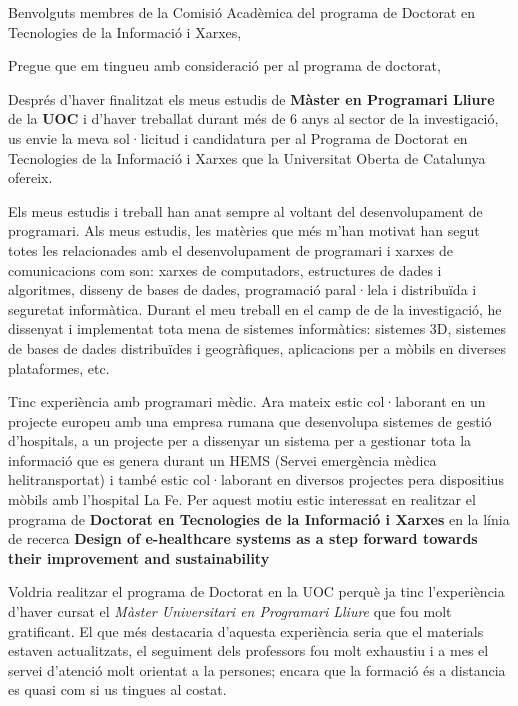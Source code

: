 
%
%


\date{\today}
\opening{Benvolguts membres de la Comisió Acadèmica del programa de Doctorat en Tecnologies de la Informació i Xarxes,}
\closing{Pregue que em tingueu amb consideració per al programa de doctorat,}




\makelettertitle

Després d'haver finalitzat els meus estudis de \textbf{Màster en Programari Lliure} de la \textbf{UOC} i d'haver treballat durant més de 6 anys al sector de la investigació, us envie la meva sol·licitud i candidatura per al Programa de Doctorat en Tecnologies de la Informació i Xarxes que la Universitat Oberta de Catalunya ofereix.

Els meus estudis i treball han anat sempre al voltant del desenvolupament de programari. Als meus estudis, les matèries que més m'han motivat han segut totes les relacionades amb el desenvolupament de programari i xarxes de comunicacions com son: xarxes de computadors, estructures de dades i algoritmes, disseny de bases de dades, programació paral·lela i distribuïda i seguretat informàtica. Durant el meu treball en el camp de de la investigació, he dissenyat i implementat tota mena de sistemes informàtics: sistemes 3D, sistemes de bases de dades distribuïdes i geogràfiques, aplicacions per a mòbils en diverses plataformes, etc.

Tinc experiència amb programari mèdic. Ara mateix estic col·laborant en un projecte europeu amb una empresa rumana que desenvolupa sistemes de gestió d'hospitals, a un projecte per a dissenyar un sistema per a gestionar tota la informació que es genera durant un HEMS (Servei emergència mèdica helitransportat) i també estic col·laborant en diversos projectes pera dispositius mòbils amb l'hospital La Fe.  Per aquest motiu estic interessat en realitzar el programa de \textbf{Doctorat en Tecnologies de la Informació i Xarxes} en la línia de recerca \textbf{Design of e-healthcare systems as a step forward towards their improvement and sustainability} 

Voldria realitzar el programa de Doctorat en la UOC perquè ja tinc l'experiència d'haver cursat el \textit{Màster Universitari en Programari Lliure} que fou molt gratificant. El que més destacaria d'aquesta experiència seria que el materials estaven actualitzats, el seguiment dels professors fou molt exhaustiu i a mes el servei d'atenció molt orientat a la persones; encara que la formació és a distancia es quasi com si  us tingues al costat. 

\makeletterclosing

\clearpage